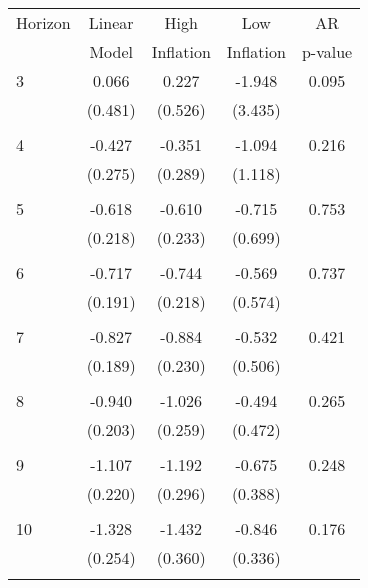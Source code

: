 \begin{tabular}{l*{1}{cccc}}
\hline\hline
 Horizon  & Linear & High                 & Low           & AR            \\
                  & Model         & Inflation & Inflation & p-value       \\
\hline
   3       & 0.066 & 0.227 & -1.948 & 0.095 \\
          & (0.481) & (0.526) & (3.435) & \\
 & & & &\\
   4       & -0.427 & -0.351 & -1.094 & 0.216 \\
          & (0.275) & (0.289) & (1.118) & \\
 & & & &\\
   5       & -0.618 & -0.610 & -0.715 & 0.753 \\
          & (0.218) & (0.233) & (0.699) & \\
 & & & &\\
   6       & -0.717 & -0.744 & -0.569 & 0.737 \\
          & (0.191) & (0.218) & (0.574) & \\
 & & & &\\
   7       & -0.827 & -0.884 & -0.532 & 0.421 \\
          & (0.189) & (0.230) & (0.506) & \\
 & & & &\\
   8       & -0.940 & -1.026 & -0.494 & 0.265 \\
          & (0.203) & (0.259) & (0.472) & \\
 & & & &\\
   9       & -1.107 & -1.192 & -0.675 & 0.248 \\
          & (0.220) & (0.296) & (0.388) & \\
 & & & &\\
  10       & -1.328 & -1.432 & -0.846 & 0.176 \\
          & (0.254) & (0.360) & (0.336) & \\
 & & & &\\
\hline\hline
\end{tabular}
